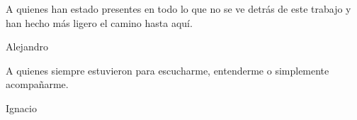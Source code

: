 \clearpage
\thispagestyle{empty}

\vspace*{0.16\textheight}

\begin{center}
\begingroup
\small\itshape
{}

\begin{minipage}{0.84\textwidth}
\centering
A quienes han estado presentes en todo lo que no se ve detrás de este trabajo y han hecho más ligero el camino hasta aquí.

\vspace{0.5cm}

\begin{flushright}
Alejandro
\end{flushright}
\end{minipage}

\vfill

\begin{minipage}{0.84\textwidth}
\centering
A quienes siempre estuvieron para escucharme, entenderme o simplemente acompañarme.

\vspace{0.5cm}

\begin{flushright}
Ignacio
\end{flushright}
\end{minipage}

\endgroup
\end{center}

\clearpage
